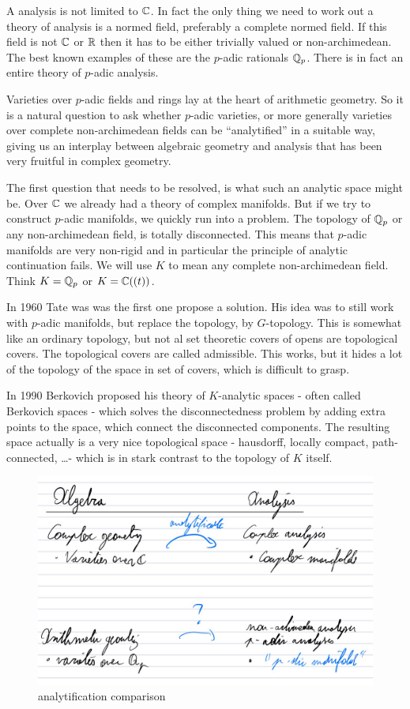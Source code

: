 \documentclass[a4paper]{article}
\begin{document}
A analysis is not limited to $\mathbb{C}$. In fact the only thing we need to work out a theory of analysis is a normed field, preferably a complete normed field. 
If this field is not $\mathbb{C}$ or $\mathbb{R}$ then it has to be either trivially valued or non-archimedean. 
The best known examples of these are the $p$-adic rationals $\mathbb{Q}_p$. 
There is in fact an entire theory of $p$-adic analysis. 

Varieties over $p$-adic fields and rings lay at the heart of arithmetic geometry. 
So it is a natural question to ask whether $p$-adic varieties, or more generally varieties over complete non-archimedean fields can be ``analytified'' in a suitable way, giving us an interplay between algebraic geometry and analysis that has been very fruitful in complex geometry. 

The first question that needs to be resolved, is what such an analytic space might be.
Over $\mathbb{C}$ we already had a theory of complex manifolds.
But if we try to construct $p$-adic manifolds, we quickly run into a problem.
The topology of $\mathbb{Q}_p$ or any non-archimedean field, is totally disconnected. 
This means that $p$-adic manifolds are very non-rigid and in particular the principle of analytic continuation fails. 
We will use $K$ to mean any complete non-archimedean field. Think $K = \mathbb{Q}_p$ or $K = \mathbb{C}((t))$. 

In 1960 Tate was was the first one propose a solution. 
His idea was to still work with $p$-adic manifolds, but replace the topology, by $G$-topology. 
This is somewhat like an ordinary topology, but not al set theoretic covers of opens are topological covers. 
The topological covers are called admissible.
This works, but it hides a lot of the topology of the space in set of covers, which is difficult to grasp.

In 1990 Berkovich proposed his theory of $K$-analytic spaces - often called Berkovich spaces - which solves the disconnectedness problem by adding extra points to the space, which connect the disconnected components. 
The resulting space actually is a very nice topological space - hausdorff, locally compact, path-connected, \ldots - which is in stark contrast to the topology of $K$ itself.  

\begin{figure}[H]
    \centering
    \includegraphics[width = .7\textwidth]{figures/analytification-comparison.png}
    \caption{analytification comparison}
    \label{fig:analytification-comparison}
\end{figure}
\end{document}
